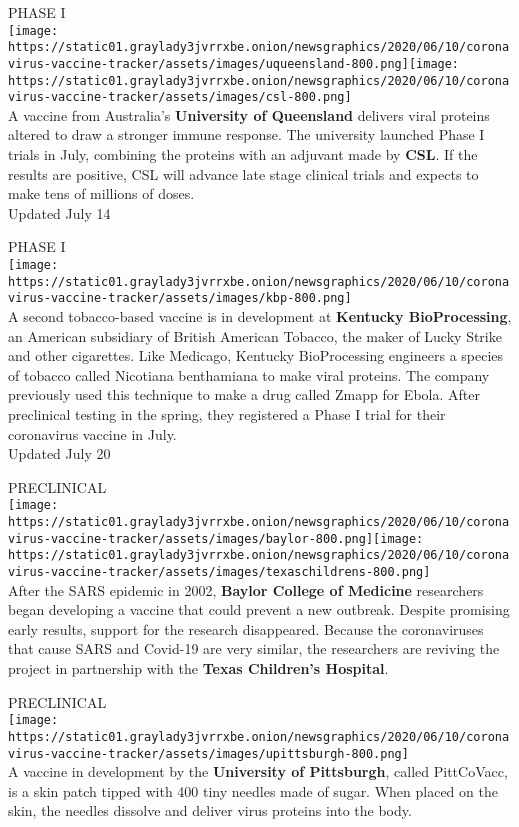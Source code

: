 PHASE I\\
\texttt{[image: https://static01.graylady3jvrrxbe.onion/newsgraphics/2020/06/10/coronavirus-vaccine-tracker/assets/images/uqueensland-800.png]}\texttt{[image: https://static01.graylady3jvrrxbe.onion/newsgraphics/2020/06/10/coronavirus-vaccine-tracker/assets/images/csl-800.png]}\\
A vaccine from Australia's \textbf{University of Queensland} delivers
viral proteins altered to draw a stronger immune response. The
university launched Phase I trials in July, combining the proteins with
an adjuvant made by \textbf{CSL}. If the results are positive, CSL will
advance late stage clinical trials and expects to make tens of millions
of doses.\\
Updated July 14

PHASE I\\
\texttt{[image: https://static01.graylady3jvrrxbe.onion/newsgraphics/2020/06/10/coronavirus-vaccine-tracker/assets/images/kbp-800.png]}\\
A second tobacco-based vaccine is in development at \textbf{Kentucky
BioProcessing}, an American subsidiary of British American Tobacco, the
maker of Lucky Strike and other cigarettes. Like Medicago, Kentucky
BioProcessing engineers a species of tobacco called Nicotiana
benthamiana to make viral proteins. The company previously used this
technique to make a drug called Zmapp for Ebola. After preclinical
testing in the spring, they registered a Phase I trial for their
coronavirus vaccine in July.\\
Updated July 20

PRECLINICAL\\
\texttt{[image: https://static01.graylady3jvrrxbe.onion/newsgraphics/2020/06/10/coronavirus-vaccine-tracker/assets/images/baylor-800.png]}\texttt{[image: https://static01.graylady3jvrrxbe.onion/newsgraphics/2020/06/10/coronavirus-vaccine-tracker/assets/images/texaschildrens-800.png]}\\
After the SARS epidemic in 2002, \textbf{Baylor College of Medicine}
researchers began developing a vaccine that could prevent a new
outbreak. Despite promising early results, support for the research
disappeared. Because the coronaviruses that cause SARS and Covid-19 are
very similar, the researchers are reviving the project in partnership
with the \textbf{Texas Children's Hospital}.

PRECLINICAL\\
\texttt{[image: https://static01.graylady3jvrrxbe.onion/newsgraphics/2020/06/10/coronavirus-vaccine-tracker/assets/images/upittsburgh-800.png]}\\
A vaccine in development by the \textbf{University of Pittsburgh},
called PittCoVacc, is a skin patch tipped with 400 tiny needles made of
sugar. When placed on the skin, the needles dissolve and deliver virus
proteins into the body.

